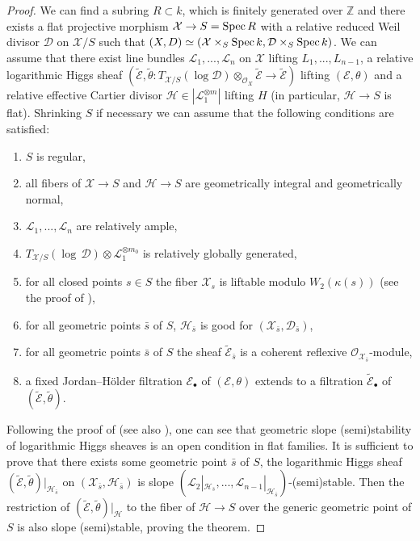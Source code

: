 \documentclass[12pt]{article}
\theoremstyle{plain}
\theoremstyle{definition}
\theoremstyle{remark}
\newcommand{\ZZ}{{\mathbb Z}}
\newcommand{\cD}{{\mathcal D}}
\newcommand{\cE}{{\mathcal E}}
\newcommand{\cH}{{\mathcal H}}
\newcommand{\cL}{{\mathcal L}}
\newcommand{\cO}{{\mathcal O}}
\newcommand{\cX}{{\mathcal X}}
\newcommand{\Spec}{{\mathop{{\rm Spec\, }}}}
\begin{document}
\begin{proof} 
	We can find a subring $R\subset k$, which is finitely generated over $\ZZ$ and there exists a flat projective morphism $\cX \to S=\Spec R$ with a relative reduced Weil divisor $\cD$ on $\cX/S$ such that $(X, D)\simeq (\cX\times _S\Spec k, \cD \times _S\Spec k)$. We can assume that 
there exist line bundles $\cL_1,..., \cL_n $ on $\cX$ lifting 	
$L_1, ...,L_{n-1}$, a relative logarithmic Higgs sheaf $(\tilde \cE , \tilde \theta : T_{\cX/S}(\log \cD) \otimes _{\cO_X}\tilde \cE \to \tilde \cE)$ lifting   $(\cE , \theta )$ and a relative effective Cartier divisor 
$\cH \in  |\cL_1^{\otimes m}|$ lifting $H$ (in particular, $\cH\to S$ is flat). Shrinking $S$ if necessary we can assume that the following conditions are satisfied:
\begin{enumerate}
\item $S$ is regular,
	\item all fibers of $\cX\to S$ and  $\cH\to S$  are geometrically integral and geometrically normal,
	\item  $\cL_1,..., \cL_n $ are relatively ample,
	\item $T_{\cX /S} (\log \, \cD)\otimes \cL_1^{\otimes m_0}$ is relatively globally generated,
	\item for all closed points $s\in S$  the fiber $\cX_s$ is liftable modulo $W_2(\kappa (s))$ (see the proof of \cite[Theorem 7]{La3}),
		\item  for all geometric points $\bar s$ of $S$, $\cH_{\bar s}$ is good for $(\cX _{\bar s}, \cD _{\bar s})$,
	\item for all geometric points $\bar s$ of $S$ the sheaf $\tilde \cE_{\bar s}$ is a coherent reflexive $\cO_{\cX_{\bar s}}$-module,
	\item a fixed Jordan--H\"older filtration $\cE_{\bullet}$ of $(\cE, \theta)$ extends to a filtration $\tilde \cE_{\bullet}$ of $(\tilde \cE , \tilde \theta)$.
\end{enumerate} 

Following the proof of \cite[Theorem 4.2]{Ma} (see also \cite[Proposition 2.3.1]{HL}), one can see that geometric slope (semi)stability of logarithmic Higgs sheaves is an open condition in flat families. 
It is sufficient to prove that there exists some geometric point $\bar s$ of $S$, the logarithmic Higgs sheaf $(\tilde \cE , \tilde \theta )|_{\cH_{\bar s}}$ on $(\cX _{\bar s},\cH _{\bar s})$ is  slope $(\cL_2|_{\cH _{\bar s}},\dots ,\cL_{n-1}|_{\cH _{\bar s}})$-(semi)stable. Then  the restriction of $(\tilde \cE , \tilde \theta)|_{\cH}$ to the fiber of $\cH\to S$ over the generic geometric point of $S$ is also slope (semi)stable, proving the theorem.


\end{proof}
\end{document}
